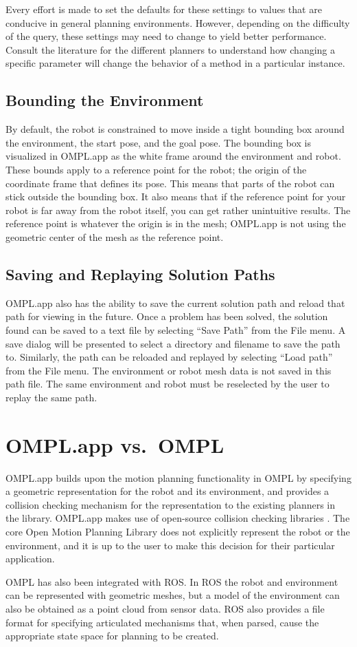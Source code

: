 Every effort is made to set the defaults for these settings to values that are
conducive in general planning environments.  However, depending on the
difficulty of the query, these settings may need to change to yield better
performance.  Consult the literature for the different planners to understand
how changing a specific parameter will change the behavior of a method in a
particular instance.

\subsection {Bounding the Environment}
By default, the robot is constrained to move inside a tight bounding box around
the environment, the start pose, and the goal pose. The bounding box is
visualized in OMPL.app as the white frame around the environment and robot.
These bounds apply to a reference point for the robot; the origin of the
coordinate frame that defines its pose. This means that parts of the robot can
stick outside the bounding box. It also means that if the reference point for
your robot is far away from the robot itself, you can get rather unintuitive
results. The reference point is whatever the origin is in the mesh; OMPL.app is
not using the geometric center of the mesh as the reference point.

\subsection {Saving and Replaying Solution Paths}
OMPL.app also has the ability to save the current solution path and reload that
path for viewing in the future.  Once a problem has been solved, the solution
found can be saved to a text file by selecting ``Save Path'' from the File menu.
A save dialog will be presented to select a directory and filename to save the
path to. Similarly, the path can be reloaded and replayed by selecting ``Load
path'' from the File menu.  The environment or robot mesh data is not saved in
this path file.  The same environment and robot must be reselected by the user
to replay the same path.

\section {OMPL.app vs.\ OMPL}
OMPL.app builds upon the motion planning functionality in OMPL by specifying
a geometric representation for the robot and its environment, and provides
a collision checking mechanism for the representation to the existing planners
in the library.  OMPL.app makes use of open-source collision checking
libraries \cite{Larsen:2000, Jia:2011}.  The core Open Motion Planning
Library does not explicitly represent the robot or the environment, and it is
up to the user to make this decision for their particular application.

OMPL has also been integrated with ROS. In ROS the robot and environment can
be represented with geometric meshes, but a model of the environment can also
be obtained as a point cloud from sensor data. ROS also provides a file
format for specifying articulated mechanisms that, when parsed, cause the
appropriate state space for planning to be created.
